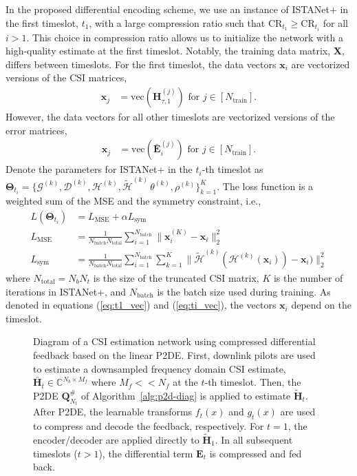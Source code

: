 In the proposed differential encoding scheme, we use an instance of ISTANet+ in the first timeslot, $t_1$, with a large compression ratio such that $\text{CR}_{t_1} \geq \text{CR}_{t_i}$ for all $i > 1$. This choice in compression ratio allows us to initialize the network with a high-quality estimate at the first timeslot. Notably, the training data matrix, $\mathbf X$, differs between timeslots. For the first timeslot, the data vectors $\mathbf{x}_i$ are vectorized versions of the CSI matrices,
\begin{align}
    \mathbf{x}_j &= \text{vec}\left(\mathbf{H}^{(j)}_{\tau,1}\right) \text{ for } j\in[N_{\text{train}}]. 
    \label{eq:t1_vec}
\end{align}
However, the data vectors for all other timeslots are vectorized versions of the error matrices,
\begin{align}
    \mathbf{x}_j &= \text{vec}\left(\bar{\mathbf{E}}^{(j)}_{i}\right) \text{ for } j\in[N_{\text{train}}]. 
    \label{eq:ti_vec}
\end{align}
Denote the parameters for ISTANet+ in the $t_i$-th timeslot as $\mathbf{\Theta}_{t_i}=\{\mathcal G^{(k)}, \mathcal D^{(k)},  \mathcal H^{(k)}, \tilde{\mathcal H}^{(k)}\, \theta^{(k)}, \rho^{(k)}\}_{k=1}^{K}$. The loss function is a weighted sum of the MSE and the symmetry constraint, i.e.,
\begin{align}
    L(\mathbf{\Theta}_{t_i}) &= L_{\text{MSE}} + \alpha L_{\text{sym}} \\
    L_{\text{MSE}} &= \frac{1}{N_{\text{batch}}N_{\text{total}}}\sum_{i=1}^{N_{\text{batch}}}\|\mathbf{x}_i^{(K)}-\mathbf{x}_i\|_2^2 \\
    L_{\text{sym}} &= \frac{1}{N_{\text{batch}}N_{\text{total}}}\sum_{i=1}^{N_{\text{batch}}}\sum_{k=1}^{K} \|\tilde{\mathcal{H}}^{(k)}(\mathcal{H}^{(k)}(\mathbf{x}_i)) - \mathbf{x}_i)\|_2^2
\end{align}
where $N_{\text{total}}=N_bN_t$ is the size of the truncated CSI matrix, $K$ is the number of iterations in ISTANet+, and $N_{\text{batch}}$ is the batch size used during training. As denoted in equations (\ref{eq:t1_vec}) and (\ref{eq:ti_vec}), the vectors $\mathbf{x}_i$ depend on the timeslot.

\begin{figure}[!hbtp]
    \centering
    {
      \fontsize{8pt}{8pt}
      \def\svgwidth{1.0\linewidth}
      
    }
    \caption{Diagram of a CSI estimation network using compressed differential feedback based on the linear P2DE. First, downlink pilots are used to estimate a downsampled frequency domain CSI estimate, $\bar{\mathbf{H}}_t\in\mathbb{C}^{N_b \times M_f}$ where $M_f << N_f$ at the $t$-th timeslot. Then, the P2DE $\mathbf{Q}^\#_{N_t}$ of Algorithm~\ref{alg:p2d-diag} is applied to estimate $\tilde{\mathbf{H}}_t$. After P2DE, the learnable transforms $f_t(x)$ and $g_t(x)$ are used to compress and decode the feedback, respectively. For $t=1$, the encoder/decoder are applied directly to $\tilde{\mathbf{H}}_1$. In all subsequent timeslots ($t > 1$), the differential term $\mathbf{E}_t$ is compressed and fed back.}
    \label{fig:markov-p2d}
\end{figure}

